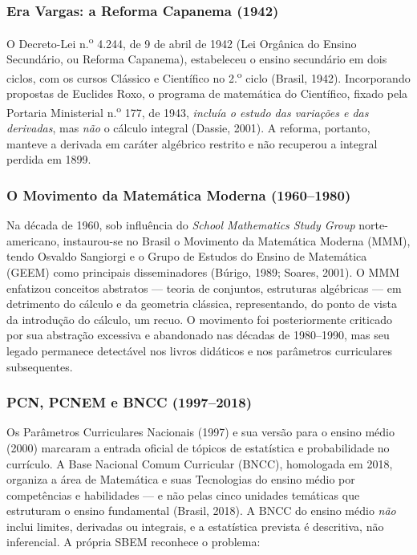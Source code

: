 \documentclass[12pt,a4paper,oneside]{article}
\begin{document}
\subsubsection{Era Vargas: a Reforma Capanema (1942)}

O Decreto-Lei n.\textsuperscript{o} 4.244, de 9 de abril de 1942 (Lei
Orgânica do Ensino Secundário, ou Reforma Capanema), estabeleceu o ensino
secundário em dois ciclos, com os cursos Clássico e Científico no
2.\textsuperscript{o} ciclo (Brasil, 1942). Incorporando propostas de
Euclides Roxo, o programa de matemática do Científico, fixado pela
Portaria Ministerial n.\textsuperscript{o} 177, de 1943, \emph{incluía o
estudo das variações e das derivadas}, mas \emph{não} o cálculo integral
(Dassie, 2001). A reforma, portanto, manteve a derivada em caráter
algébrico restrito e não recuperou a integral perdida em 1899.

\subsubsection{O Movimento da Matemática Moderna (1960--1980)}

Na década de 1960, sob influência do \emph{School Mathematics Study
Group} norte-americano, instaurou-se no Brasil o Movimento da Matemática
Moderna (MMM), tendo Osvaldo Sangiorgi e o Grupo de Estudos do Ensino de
Matemática (GEEM) como principais disseminadores (Búrigo, 1989; Soares,
2001). O MMM enfatizou conceitos abstratos --- teoria de conjuntos,
estruturas algébricas --- em detrimento do cálculo e da geometria
clássica, representando, do ponto de vista da introdução do cálculo, um
recuo. O movimento foi posteriormente criticado por sua abstração
excessiva e abandonado nas décadas de 1980--1990, mas seu legado
permanece detectável nos livros didáticos e nos parâmetros curriculares
subsequentes.

\subsubsection{PCN, PCNEM e BNCC (1997--2018)}

Os Parâmetros Curriculares Nacionais (1997) e sua versão para o ensino
médio (2000) marcaram a entrada oficial de tópicos de estatística e
probabilidade no currículo. A Base Nacional Comum Curricular (BNCC),
homologada em 2018, organiza a área de Matemática e suas Tecnologias do
ensino médio por competências e habilidades --- e não pelas cinco
unidades temáticas que estruturam o ensino fundamental (Brasil, 2018).
A BNCC do ensino médio \emph{não} inclui limites, derivadas ou integrais,
e a estatística prevista é descritiva, não inferencial. A própria SBEM
reconhece o problema:
\end{document}
